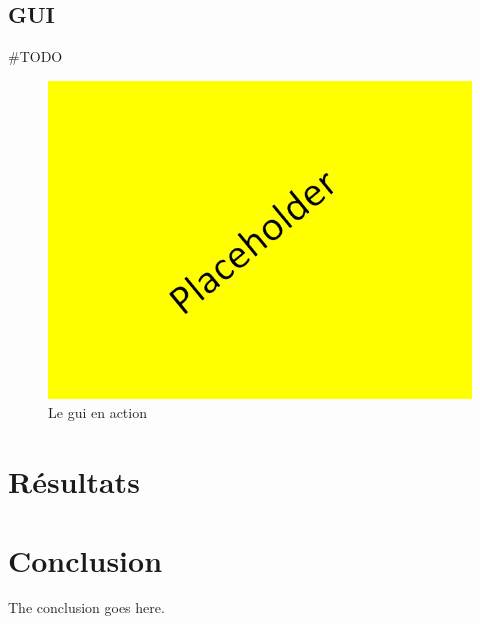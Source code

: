 \documentclass[journal]{IEEEtran}
\begin{document}
\subsection{GUI}

\#TODO

\begin{figure}
  \includegraphics[width=\linewidth]{placeholder.png}
  \caption{Le gui en action}
  \label{fig:GUI}
\end{figure}

\section{Résultats}


\section{Conclusion}
The conclusion goes here.




%
\end{document}
